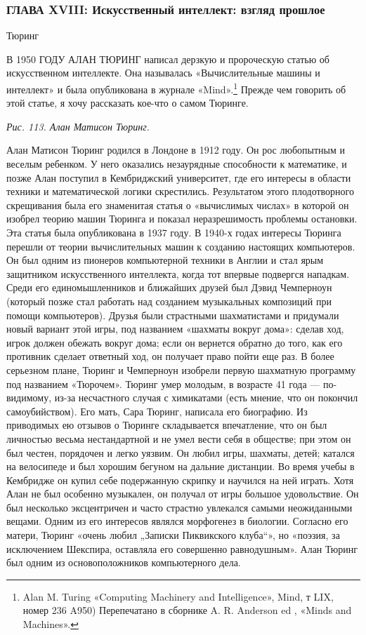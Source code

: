 \subsubsection{ГЛАВА XVIII: Искусственный интеллект: взгляд  прошлое}

Тюринг

В 1950 ГОДУ АЛАН ТЮРИНГ написал дерзкую и пророческую статью об искусственном интеллекте. Она называлась «Вычислительные машины и интеллект» и была опубликована в журнале «Mind».\footnote{Alan M. Turing «Computing Machinery and Intelligence», Mind, т LIX, номер 236 A950) Перепечатано в сборнике A. R. Anderson ed , «Minds and Machines».} Прежде чем говорить об этой статье, я хочу рассказать кое-что о самом Тюринге.

\emph{Рис. 113. Алан Матисон Тюринг.}

Алан Матисон Тюринг родился в Лондоне в 1912 году. Он рос любопытным и веселым ребенком. У него оказались незаурядные способности к математике, и позже Алан поступил в Кембриджский университет, где его интересы в области техники и математической логики скрестились. Результатом этого плодотворного скрещивания была его знаменитая статья о «вычислимых числах» в которой он изобрел теорию машин Тюринга и показал неразрешимость проблемы остановки. Эта статья была опубликована в 1937 году. В 1940-х годах интересы Тюринга перешли от теории вычислительных машин к созданию настоящих компьютеров. Он был одним из пионеров компьютерной техники в Англии и стал ярым защитником искусственного интеллекта, когда тот впервые подвергся нападкам. Среди его единомышленников и ближайших друзей был Дэвид Чемперноун (который позже стал работать над созданием музыкальных композиций при помощи компьютеров). Друзья были страстными шахматистами и придумали новый вариант этой игры, под названием «шахматы вокруг дома»: сделав ход, игрок должен обежать вокруг дома; если он вернется обратно до того, как его противник сделает ответный ход, он получает право пойти еще раз. В более серьезном плане, Тюринг и Чемперноун изобрели первую шахматную программу под названием «Тюрочем». Тюринг умер молодым, в возрасте 41 года --- по-видимому, из-за несчастного случая с химикатами (есть мнение, что он покончил самоубийством). Его мать, Сара Тюринг, написала его биографию. Из приводимых ею отзывов о Тюринге складывается впечатление, что он был личностью весьма нестандартной и не умел вести себя в обществе; при этом он был честен, порядочен и легко уязвим. Он любил игры, шахматы, детей; катался на велосипеде и был хорошим бегуном на дальние дистанции. Во время учебы в Кембридже он купил себе подержанную скрипку и научился на ней играть. Хотя Алан не был особенно музыкален, он получал от игры большое удовольствие. Он был несколько эксцентричен и часто страстно увлекался самыми неожиданными вещами. Одним из его интересов являлся морфогенез в биологии. Согласно его матери, Тюринг «очень любил „Записки Пиквикского клуба``», но «поэзия, за исключением Шекспира, оставляла его совершенно равнодушным». Алан Тюринг был одним из основоположников компьютерного дела.

